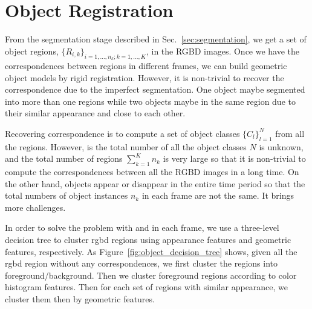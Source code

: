 
\section{Object Registration}
\label{sec:region_registration}

From the segmentation stage described in Sec.~\ref{sec:segmentation}, we get a set of object regions, $\{R_{i,k}\}_{i=1,\ldots,n_k;k=1,\ldots,K}$, in the RGBD images.
Once we have the correspondences between regions in different frames, we can build geometric object models by rigid registration. 
However, it is non-trivial to recover the correspondence due to the imperfect segmentation.
One object maybe segmented into more than one regions while two objects maybe in the same region due to their similar appearance and close to each other. 


Recovering correspondence is to compute a set of object classes $\{C_{l}\}^N_{l=1}$ from all the regions. However,  is the total number of all the object classes $N$ is unknown, and the total number of regions $\sum_{k=1}^{K} n_k$ is very large so that it is non-trivial to compute the correspondences between all the RGBD images in a long time.
On the other hand, objects appear or disappear in the entire time period so that the total numbers of object instances $n_k$ in each frame are not the same. It brings more challenges. 



In order to solve the problem with  and  in each frame, we use a three-level decision tree to cluster rgbd regions using appearance features and geometric features, respectively. 
As Figure~\ref{fig:object_decision_tree} shows,
given all the rgbd region without any correspondences, we first cluster the regions into foreground/background. 
Then we cluster foreground regions according to color histogram features. Then for each set of regions with similar appearance, we cluster them then by geometric features.  

